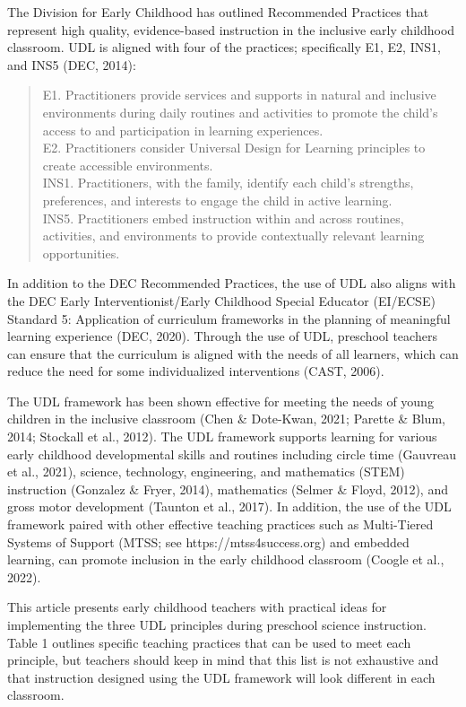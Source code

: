 \documentclass[11.5pt]{sig-alternate}
\begin{document}
\begin{large}
The Division for Early Childhood has outlined Recommended Practices that represent high quality, evidence-based instruction in the inclusive early childhood classroom. UDL is aligned with four of the practices; specifically E1, E2, INS1, and INS5 (DEC, 2014):
\begin{quote} E1. Practitioners provide services and supports in natural and inclusive environments
during daily routines and activities to promote the child’s access to and
participation in learning experiences.
\\E2. Practitioners consider Universal Design for Learning principles to create accessible
environments.
\\INS1. Practitioners, with the family, identify each child's strengths, preferences, and
interests to engage the child in active learning.
\\ INS5. Practitioners embed instruction within and across routines, activities, and
environments to provide contextually relevant learning opportunities.\end{quote} 
In addition to the DEC Recommended Practices, the use of UDL also aligns with the DEC Early Interventionist/Early Childhood Special Educator (EI/ECSE) Standard 5: Application of curriculum frameworks in the planning of meaningful learning experience (DEC, 2020). Through the use of UDL, preschool teachers can ensure that the curriculum is aligned with the needs of all learners, which can reduce the need for some individualized interventions (CAST, 2006).

The UDL framework has been shown effective for meeting the needs of young children in the inclusive classroom (Chen \& Dote-Kwan, 2021; Parette \& Blum, 2014; Stockall et al., 2012). The UDL framework supports learning for various early childhood developmental skills and routines including circle time (Gauvreau et al., 2021), science, technology, engineering, and mathematics (STEM) instruction (Gonzalez \& Fryer, 2014), mathematics (Selmer \& Floyd, 2012), and gross motor development (Taunton et al., 2017). In addition, the use of the UDL framework paired with other effective teaching practices such as Multi-Tiered Systems of Support (MTSS; see https://mtss4success.org) and embedded learning, can promote inclusion in the early childhood classroom (Coogle et al., 2022).

This article presents early childhood teachers with practical ideas for implementing the three UDL principles during preschool science instruction. Table 1 outlines specific teaching practices that can be used to meet each principle, but teachers should keep in mind that this list is not exhaustive and that instruction designed using the UDL framework will look different in each classroom.


\end{large}
\end{document}

